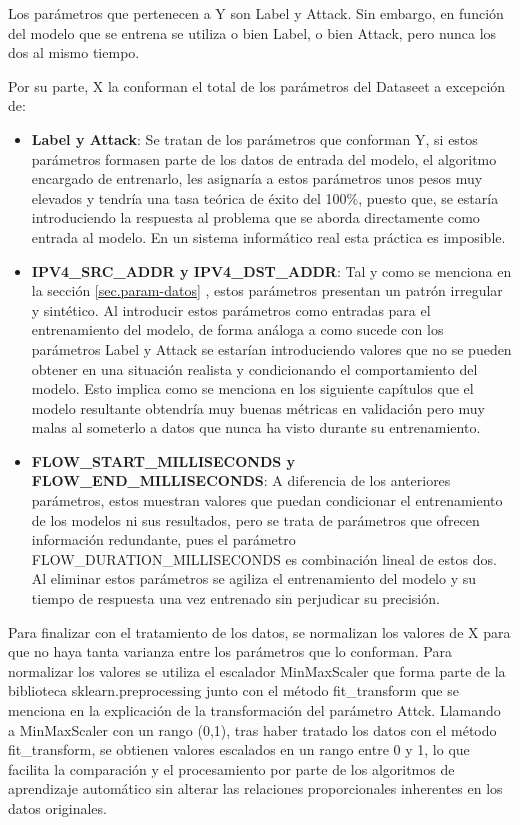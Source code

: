 Los parámetros que pertenecen a Y son Label y Attack. Sin embargo, en función del modelo que se entrena se utiliza o bien Label, o bien Attack, pero nunca los dos al mismo tiempo.

Por su parte, X la conforman el total de los parámetros del Dataseet a excepción de:
\begin{itemize}
	\item \textbf{Label y Attack}: Se tratan de los parámetros que conforman Y, si estos parámetros formasen parte de los datos de entrada del modelo, el algoritmo encargado de entrenarlo, les asignaría a estos parámetros unos pesos muy elevados y tendría una tasa teórica de éxito del 100\%, puesto que, se estaría introduciendo la respuesta al problema que se aborda directamente como entrada al modelo. En un sistema informático real esta práctica es imposible.
	\item \textbf{IPV4\_SRC\_ADDR y IPV4\_DST\_ADDR}: Tal y como se menciona en la sección \ref{sec.param-datos} , estos parámetros presentan un patrón irregular y sintético. Al introducir estos parámetros como entradas para el entrenamiento del modelo, de forma análoga a como sucede con los parámetros Label y Attack se estarían introduciendo valores que no se pueden obtener en una situación realista y condicionando el comportamiento del modelo. Esto implica como se menciona en los siguiente capítulos que el modelo resultante obtendría muy buenas métricas en validación pero muy malas al someterlo a datos que nunca ha visto durante su entrenamiento.
	\item \textbf{FLOW\_START\_MILLISECONDS y FLOW\_END\_MILLISECONDS}: A diferencia de los anteriores parámetros, estos muestran valores que puedan condicionar el entrenamiento de los modelos ni sus resultados, pero se trata de parámetros que ofrecen información redundante, pues el parámetro FLOW\_DURATION\_MILLISECONDS es combinación lineal de estos dos. Al eliminar estos parámetros se agiliza el entrenamiento del modelo y su tiempo de respuesta una vez entrenado sin perjudicar su precisión.
\end{itemize}

Para finalizar con el tratamiento de los datos, se normalizan los valores de X para que no haya tanta varianza entre los parámetros que lo conforman. Para normalizar los valores se utiliza el escalador MinMaxScaler que forma parte de la biblioteca sklearn.preprocessing junto con el método fit\_transform que se menciona en la explicación de la transformación del parámetro Attck. Llamando a MinMaxScaler con un rango (0,1), tras haber tratado los datos con el método fit\_transform, se obtienen valores escalados en un rango entre 0 y 1, lo que facilita la comparación y el procesamiento por parte de los algoritmos de aprendizaje automático sin alterar las relaciones proporcionales inherentes en los datos originales.
